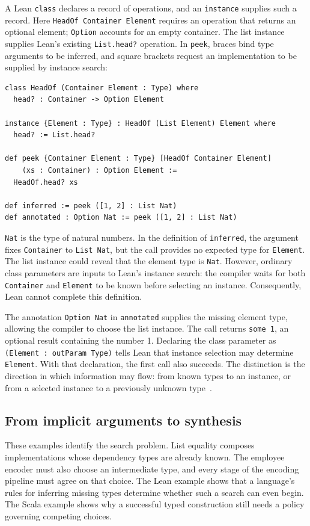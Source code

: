 \documentclass[10pt,a4paper]{article}
\begin{document}
A Lean \texttt{class} declares a record of operations, and an \texttt{instance}
supplies such a record. Here \texttt{HeadOf Container Element} requires an operation
that returns an optional element; \texttt{Option} accounts for an empty container.
The list instance supplies Lean's existing \texttt{List.head?} operation.
In \texttt{peek}, braces bind type arguments to be inferred, and square brackets
request an implementation to be supplied by instance search:
\begin{lstlisting}
class HeadOf (Container Element : Type) where
  head? : Container -> Option Element

instance {Element : Type} : HeadOf (List Element) Element where
  head? := List.head?

def peek {Container Element : Type} [HeadOf Container Element]
    (xs : Container) : Option Element :=
  HeadOf.head? xs

def inferred := peek ([1, 2] : List Nat)
def annotated : Option Nat := peek ([1, 2] : List Nat)
\end{lstlisting}
\texttt{Nat} is the type of natural numbers. In the definition of
\texttt{inferred}, the argument fixes \texttt{Container} to \texttt{List Nat},
but the call provides no expected type for \texttt{Element}. The list instance
could reveal that the element type is \texttt{Nat}. However, ordinary class
parameters are inputs to Lean's instance search: the compiler waits for both
\texttt{Container} and \texttt{Element} to be known before selecting an instance.
Consequently, Lean cannot complete this definition.

The annotation \texttt{Option Nat} in \texttt{annotated} supplies the missing
element type, allowing the compiler to choose the list instance. The call returns
\texttt{some 1}, an optional result containing the number 1. Declaring the class parameter as
\texttt{(Element : outParam Type)} tells Lean that instance selection may determine
\texttt{Element}. With that declaration, the first call also succeeds.
The distinction is the direction in which information may flow: from known types
to an instance, or from a selected instance to a previously unknown
type~\cite{lean-synthesis}.

\subsection{From implicit arguments to synthesis}
These examples identify the search problem. List equality composes implementations
whose dependency types are already known. The employee encoder must also choose an
intermediate type, and every stage of the encoding pipeline must agree on that
choice. The Lean example shows that a language's rules for inferring missing types
determine whether such a search can even begin. The Scala example shows why a
successful typed construction still needs a policy governing competing choices.
\end{document}
